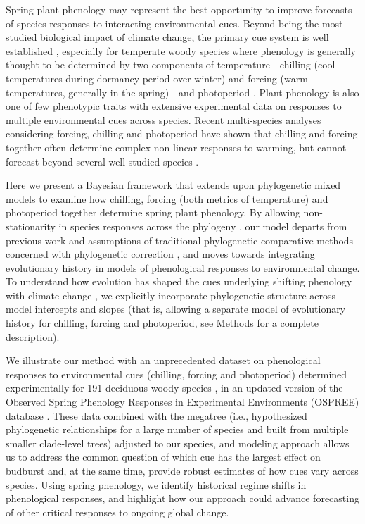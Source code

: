 \documentclass{article}
\begin{document}
Spring plant phenology may represent the best opportunity to improve forecasts of species responses to interacting environmental cues. Beyond being the most studied biological impact of climate change, the primary cue system is well established \citep{chuinearees}, especially for temperate woody species where phenology is generally thought to be determined by two components of temperature---chilling (cool temperatures during dormancy period over winter) and forcing (warm temperatures, generally in the spring)---and photoperiod \citep{ospreephoto}. Plant phenology is also one of few phenotypic traits with extensive experimental data on responses to multiple environmental cues across species. Recent multi-species analyses considering forcing, chilling and photoperiod have shown that chilling and forcing together often determine complex non-linear responses to warming, but cannot forecast beyond several well-studied species \citep{ettinger2020}. 


Here we present a Bayesian framework that extends upon phylogenetic mixed models \citep{housworth2004phylogenetic} to examine how chilling, forcing (both metrics of temperature) and photoperiod together determine spring plant phenology. By allowing non-stationarity in species responses across the phylogeny \citep{davies2019phylogenetically}, our model departs from previous work and assumptions of traditional phylogenetic comparative methods concerned with phylogenetic correction \citep[e.g.,][]{freckleton2002phylogenetic}, and moves towards integrating evolutionary history in models of phenological responses to environmental change. To understand how evolution has shaped the cues underlying shifting phenology with climate change \citep{uyeda2017evolution}, we explicitly incorporate phylogenetic structure across model intercepts and slopes (that is, allowing a separate model of evolutionary history for chilling, forcing and photoperiod, see Methods for a complete description). 

We illustrate our method with an unprecedented dataset on phenological responses to environmental cues (chilling, forcing and photoperiod) determined experimentally for 191 deciduous woody species \cite[by far the most studied group of species in phenology experiments, see][]{ettinger2020}, in an updated version of the Observed Spring Phenology Responses in Experimental Environments (OSPREE) database \citep{wolkovich2019}. These data combined with the \citet{smith2018constructing} megatree (i.e., hypothesized phylogenetic relationships for a large number of species and built from multiple smaller clade-level trees) adjusted to our species, and modeling approach allows us to address the common question of which cue has the largest effect on budburst and, at the same time, provide robust estimates of how cues vary across species. Using spring phenology, we identify historical regime shifts \citep{uyeda2017evolution} in phenological responses, and highlight how our approach could advance forecasting of other critical responses to ongoing global change.
\end{document}
